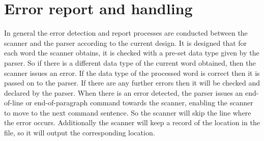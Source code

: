 \documentclass[12pt]{article}
\begin{document}
\vspace{20mm}
\section{Error report and handling}
In general the error detection and report processes are conducted between the scanner and the parser according to the current design. It is designed that for each word the scanner obtains, 
it is checked with a pre-set data type given by the parser. So if there is a different data type of the current word obtained, then the scanner issues an error. If the data type of 
the processed word is correct then it is passed on to the parser. If there are any further errors then it will be checked and declared by the parser.
When there is an error detected, the parser issues an end-of-line or end-of-paragraph command towards the scanner, enabling the scanner to move to the next command sentence. So the 
scanner will skip the line where the error occurs. Additionally the scanner will keep a record of the location in the file, so it will output the corresponding location.
\end{document}
